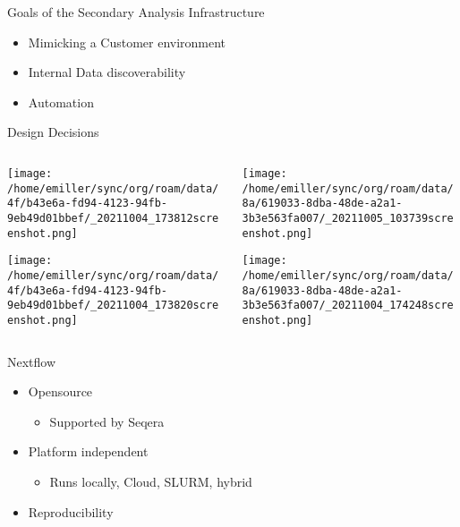 \documentclass[bigger]{beamer}
\begin{document}
\begin{frame}[label={sec:org8c84131}]{Goals of the Secondary Analysis Infrastructure}
\begin{itemize}
\item Mimicking a Customer environment
\item Internal Data discoverability
\item \alert{Automation}
\end{itemize}
\end{frame}

\begin{frame}[label={sec:org4a8af58}]{Design Decisions}
\begin{columns}
\begin{column}{0.35\columnwidth}
\begin{center}
\texttt{[image: /home/emiller/sync/org/roam/data/4f/b43e6a-fd94-4123-94fb-9eb49d01bbef/\_20211004\_173812screenshot.png]}
\end{center}


\begin{center}
\texttt{[image: /home/emiller/sync/org/roam/data/4f/b43e6a-fd94-4123-94fb-9eb49d01bbef/\_20211004\_173820screenshot.png]}
\end{center}
\end{column}

\begin{column}{0.5\columnwidth}
\begin{center}
\texttt{[image: /home/emiller/sync/org/roam/data/8a/619033-8dba-48de-a2a1-3b3e563fa007/\_20211005\_103739screenshot.png]}
\end{center}


\begin{center}
\texttt{[image: /home/emiller/sync/org/roam/data/8a/619033-8dba-48de-a2a1-3b3e563fa007/\_20211004\_174248screenshot.png]}
\end{center}
\end{column}
\end{columns}
\end{frame}

\begin{frame}[label={sec:orgb04d7e5}]{Nextflow}
\begin{itemize}
\item Opensource
\begin{itemize}
\item Supported by Seqera
\end{itemize}

\item Platform independent
\begin{itemize}
\item Runs locally, Cloud, SLURM, hybrid
\end{itemize}

\item Reproducibility
\end{itemize}
\end{frame}
\end{document}
